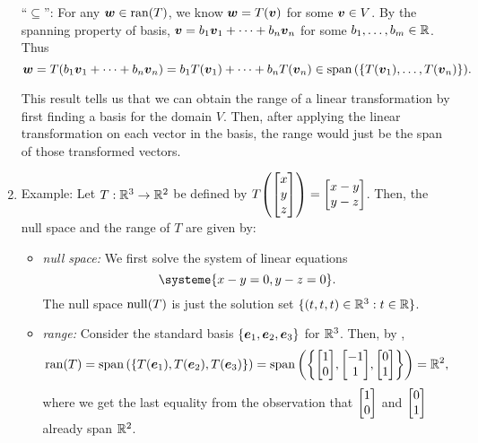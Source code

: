 \begin{enumerate}
\begin{pf}
``\(\subseteq\)'': For any \(\vb*{w}\in\operatorname{ran}(T)\), we know
\(\vb*{w}=T(\vb*{v})\) for some \(\vb*{v}\in V\). By the spanning property
of basis, \(\vb*{v}=b_1\vb*{v}_1+\dotsb+b_n\vb*{v}_n\) for some
\(b_1,\dotsc,b_m\in\mathbb{R}\). Thus
\[
\vb*{w}=T(b_1\vb*{v}_1+\dotsb+b_n\vb*{v}_n)=b_1T(\vb*{v}_1)+\dotsb+b_nT(\vb*{v}_n)
\in\operatorname{span}\qty(\{T(\vb*{v}_1),\dotsc,T(\vb*{v}_n)\}).
\]
\end{pf}

This result tells us that we can obtain the range of a linear transformation by
first finding a basis for the domain \(V\). Then, after applying the linear
transformation on each vector in the basis, the range would just be the span of
those transformed vectors.

\item Example: Let \(T:\mathbb{R}^3\to\mathbb{R}^2\) be defined by \(T\qty(\mqty[x\\ y\\
z])=\mqty[x-y\\ y-z]\). Then, the null space and the range of \(T\) are given
by:
\begin{itemize}
\item \emph{null space:} We first solve the system of linear equations
\[
\systeme{x-y=0, y-z=0}.
\]
The null space \(\operatorname{null}(T)\) is just the solution set
\(\{(t,t,t)\in\mathbb{R}^3:t\in\mathbb{R}\}\).

\item \emph{range:} Consider the standard basis
\(\{\vb*{e}_1,\vb*{e}_2,\vb*{e}_3\}\) for \(\mathbb{R}^3\). Then, by
,
\[
\ran{T}=\spn{\{T(\vect{e}_1),T(\vect{e}_2),T(\vect{e}_3)\}}
=\spn{\qty{\mqty[1\\ 0], \mqty[-1\\ 1], \mqty[0\\ 1]}}
=\R^2,
\]
where we get the last equality from the observation that \(\mqty[1\\ 0]\) and
\(\mqty[0\\ 1]\) already span \(\mathbb{R}^2\).
\end{itemize}

%


\end{enumerate}
